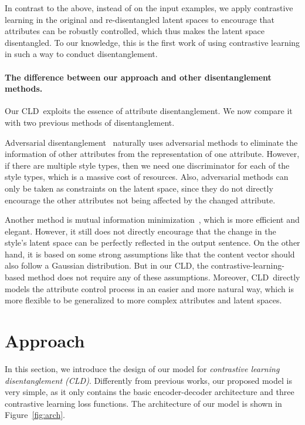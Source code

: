 \documentclass[11pt,a4paper]{article}
\newcommand{\Mname}{CLD}
\renewcommand{\cite}{\citep}
\begin{document}
In contrast to the above, instead of on the input examples, we apply contrastive learning in the original and re-disentangled latent spaces to encourage that attributes can be robustly controlled, which thus makes the latent space disentangled. To our knowledge, this is the first work of using contrastive learning in such a way to conduct disentanglement. %

\paragraph{The difference between our approach and other disentanglement methods.}
Our \Mname\   exploits the essence of attribute disentanglement. We now compare it with two previous methods of  disentanglement.

Adversarial disentanglement~\cite{chen2016infogan,john-etal-2019-disentangled} naturally uses adversarial methods to eliminate the information of other attributes from the representation of one attribute. However, if there are multiple style types, then we need one discriminator for each of the style types, which is a massive cost of resources. Also, adversarial methods can only be taken as constraints on the latent space, since they do not directly encourage the other attributes not being affected by the changed attribute.


Another method is mutual information minimization~\cite{moyer2018invariant,sha2021multi}, which is more efficient and elegant. However, it still does not directly encourage that the change in the style's latent space can be perfectly reflected in the output sentence.  On the other hand, it is based on some strong assumptions like that the content vector should also follow a Gaussian distribution. But in our  \Mname, the contrastive-learning-based method does not require any of these assumptions. Moreover, \Mname\ directly models the attribute control process in an easier and more natural way, which is more flexible to be generalized to more complex attributes and  latent spaces.

\vspace*{-1ex}\section{Approach}
In this section, we introduce the design of our model
for \emph{contrastive learning disentanglement (CLD)}. Differently from  previous works, our proposed model is very simple, as it only contains the basic encoder-decoder architecture and three contrastive learning loss functions. The architecture of our model is shown in Figure~\ref{fig:arch}.
\end{document}
